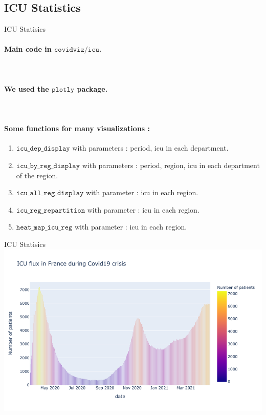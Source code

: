 \documentclass[11pt, compress, tikz, xcolor=table]{beamer}
\theoremstyle{definition}
\begin{document}
\subsection{ICU Statistics}
\begin{frame}[fragile]{ICU Statisics} 

\paragraph{Main code in $\texttt{covidviz/icu}$.}\\
\paragraph{We used the $\texttt{plotly}$ package.}\\
\paragraph{Some functions for many visualizations :}
 \begin{enumerate}
    \item $\texttt{icu\_dep\_display}$ with parameters : period, icu in each department.
    \item $\texttt{icu\_by\_reg\_display}$ with parameters : period, region, icu in each department of the region.
    \item $\texttt{icu\_all\_reg\_display}$
    with parameter : icu in each region.
    \item $\texttt{icu\_reg\_repartition}$
    with parameter : icu in each region.
    \item $\texttt{heat\_map\_icu\_reg}$ with parameter : icu in each region. 
 \end{enumerate}

\end{frame}


\begin{frame}[fragile]{ICU Statisics} 
       \centering
        \includegraphics[width= 12 cm]{images/icu.png}\\

\end{frame}
\end{document}
